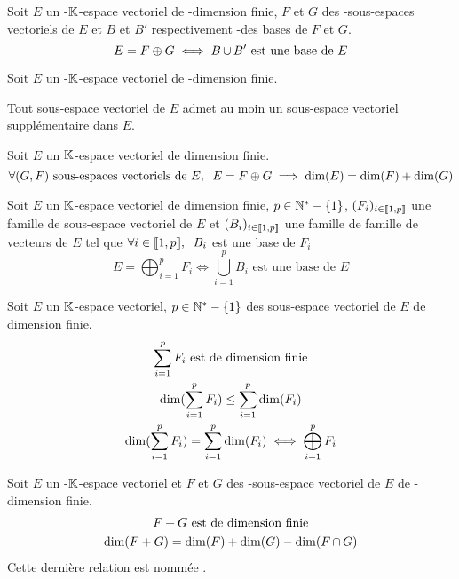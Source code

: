\begin{prp}
Soit $E$ un \hyp{$\mathbb{K}$-espace vectoriel de} \hyp{dimension finie},
$F$ et $G$ des \hyp{sous-espaces vectoriels de $E$} et $B$ et $B'$
respectivement \hyp{des bases de $F$ et $G$}.
\[
    E = F \oplus G \iff B \operatorname{\cup} B' \text{ est une base de } E
\]
\end{prp}

\begin{prp}
Soit $E$ un \hyp{$\mathbb{K}$-espace vectoriel} de \hyp{dimension finie}.

Tout sous-espace vectoriel de $E$ admet au moin un sous-espace vectoriel
supplémentaire dans $E$.
\end{prp}

\begin{prp}
Soit $E$ un $\mathbb{K}$-espace vectoriel de dimension finie.
\[
    \forall (G, F) \text{ sous-espaces vectoriels de } E, \;\;
    E = F \oplus G \implies \operatorname{dim}(E) = \operatorname{dim}(F) + \operatorname{dim}(G)
\]
\end{prp}

\begin{prp}
Soit $E$ un $\mathbb{K}$-espace vectoriel de dimension finie, $p \in \mathbb{N}^*-\{1\}$,
$(F_i)_{i \in \llbracket 1, p \rrbracket}$ une famille de sous-espace vectoriel de
$E$ et $(B_i)_{i \in \llbracket 1, p \rrbracket}$ une famille de famille de vecteurs
de $E$ tel que $\forall i \in \llbracket 1, p \rrbracket, \;\; 
B_i$ est une base de $F_i$
\[
    E = \bigoplus_{i = 1}^p F_i \iff \bigcup_{i = 1}^p B_i \text{ est
    une base de } E
\]
\end{prp}

\begin{prp}
Soit $E$ un $\mathbb{K}$-espace vectoriel, $p \in \mathbb{N}^*-\{1\}$ des
sous-espace vectoriel de $E$ de dimension finie.
\begin{gather*}
    \sum_{i = 1}^p F_i \text{ est de dimension finie} \\
    \operatorname{dim}(\sum_{i = 1}^p F_i) \leq \sum_{i = 1}^p \operatorname{dim}(F_i) \\
    \operatorname{dim}(\sum_{i = 1}^p F_i) = \sum_{i = 1}^p \operatorname{dim}(F_i) \iff
    \bigoplus_{i = 1}^p F_i
\end{gather*}
\end{prp}

\begin{prp}
Soit $E$ un \hyp{$\mathbb{K}$-espace vectoriel} et $F$ et $G$ des \hyp{sous-espace
vectoriel de $E$} de \hyp{dimension finie}.
\begin{gather*}
    F + G \text{ est de dimension finie} \\
    \operatorname{dim}(F + G) = \operatorname{dim}(F) + \operatorname{dim}(G) - \operatorname{dim}(F \operatorname{\cap} G)
\end{gather*}
Cette dernière relation est nommée .
\end{prp}


